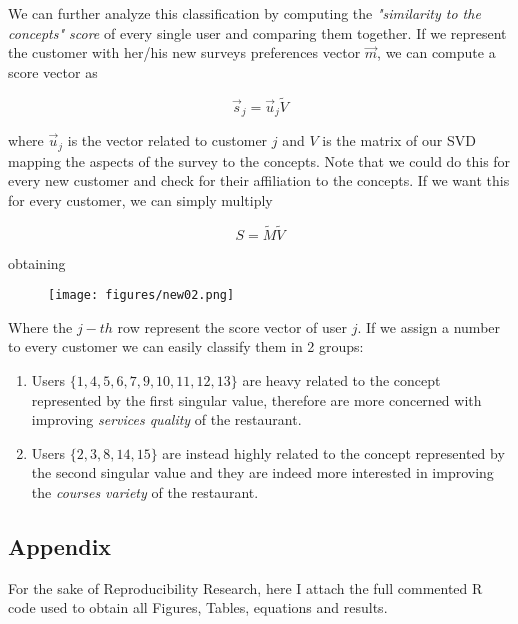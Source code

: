 \documentclass[10pt]{article}
\theoremstyle{plain}
\theoremstyle{definition}
\begin{document}
We can further analyze this classification by computing the  \textit{"similarity to the concepts" score} of every single user and comparing them together.
If we represent the customer with her/his new surveys preferences vector $\Vec{m}$, we can compute a score vector as

\begin{equation}
\Vec{s}_j = \Vec{u}_j\tilde{V}
\end{equation}

where $\Vec{u}_j$ is the vector related to customer $j$ and $V$ is the matrix of our SVD mapping the aspects of the survey to the concepts. Note that we could do this for every new customer and check for their affiliation to the concepts. 
If we want this for every customer, we can simply multiply

\begin{equation}
S = \tilde{M}\tilde{V}
\end{equation}

obtaining

 \begin{figure}[H]
	\centering
	\texttt{[image: figures/new02.png]}
	\label{fig4}
\end{figure}

Where the $j-th$ row represent the score vector of user $j$.
\newpage
If we assign a number to every customer we can easily classify them in 2 groups:
\begin{enumerate}
	\item Users $\{1,4,5,6,7,9,10,11,12,13\}$ are heavy related to the concept represented by the first singular value, therefore are more concerned with improving \textit{services quality} of the restaurant.
	\item Users $\{2,3,8,14,15\}$ are instead highly related to the concept represented by the second singular value 	and they are indeed more interested in improving the \textit{courses variety} of the restaurant.
\end{enumerate}
\newpage
\subsection{Appendix}
For the sake of Reproducibility Research, here I attach the full commented R code used to obtain all Figures, Tables, equations and results.
\\

\end{document}
